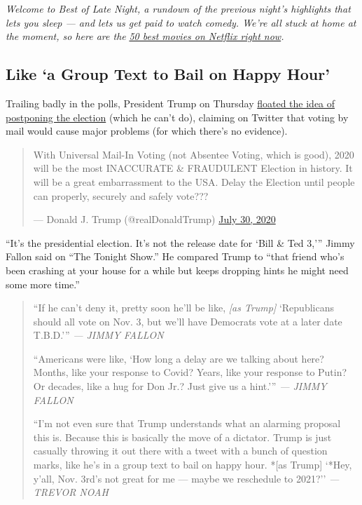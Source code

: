 \emph{Welcome to Best of Late Night, a rundown of the previous night's
highlights that lets you sleep --- and lets us get paid to watch comedy.
We're all stuck at home at the moment, so here are the}
\href{https://www.nytimes.com/interactive/2020/arts/television/best-movies-on-netflix.html}{\emph{50
best movies on Netflix right now}}\emph{.}

\hypertarget{like-a-group-text-to-bail-on-happy-hour}{%
\subsection{Like `a Group Text to Bail on Happy
Hour'}\label{like-a-group-text-to-bail-on-happy-hour}}

Trailing badly in the polls, President Trump on Thursday
\href{https://www.nytimes.com/2020/07/30/us/politics/trump-delay-2020-election.html}{floated
the idea of postponing the election} (which he can't do), claiming on
Twitter that voting by mail would cause major problems (for which
there's no evidence).

\begin{quote}
With Universal Mail-In Voting (not Absentee Voting, which is good), 2020
will be the most INACCURATE \& FRAUDULENT Election in history. It will
be a great embarrassment to the USA. Delay the Election until people can
properly, securely and safely vote???

--- Donald J. Trump (@realDonaldTrump)
\href{https://twitter.com/realDonaldTrump/status/1288818160389558273?ref_src=twsrc\%5Etfw}{July
30, 2020}
\end{quote}

``It's the presidential election. It's not the release date for `Bill \&
Ted 3,''' Jimmy Fallon said on ``The Tonight Show.'' He compared Trump
to ``that friend who's been crashing at your house for a while but keeps
dropping hints he might need some more time.''

\begin{quote}
``If he can't deny it, pretty soon he'll be like, \emph{{[}as Trump{]}}
`Republicans should all vote on Nov. 3, but we'll have Democrats vote at
a later date T.B.D.''' \emph{--- JIMMY FALLON}

``Americans were like, `How long a delay are we talking about here?
Months, like your response to Covid? Years, like your response to Putin?
Or decades, like a hug for Don Jr.? Just give us a hint.''' \emph{---
JIMMY FALLON}

``I'm not even sure that Trump understands what an alarming proposal
this is. Because this is basically the move of a dictator. Trump is just
casually throwing it out there with a tweet with a bunch of question
marks, like he's in a group text to bail on happy hour. *{[}as Trump{]}
`*Hey, y'all, Nov. 3rd's not great for me --- maybe we reschedule to
2021?'' \emph{--- TREVOR NOAH}
\end{quote}

